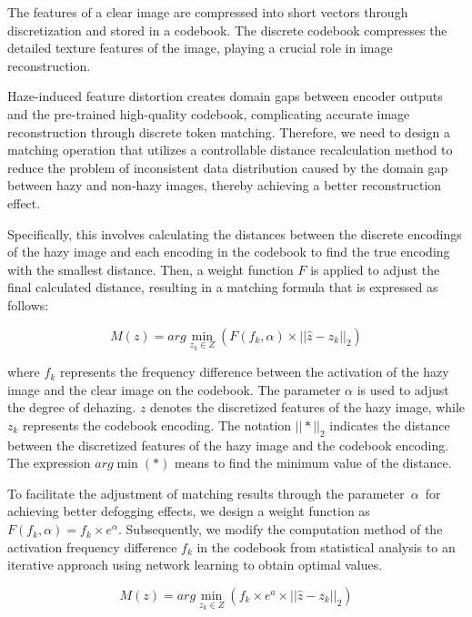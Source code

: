 \documentclass[journal]{IEEEtran}
\begin{document}
The features of a clear image are compressed into short vectors through discretization and stored in a codebook. The discrete codebook compresses the detailed texture features of the image, playing a crucial role in image reconstruction.

Haze-induced feature distortion creates domain gaps between encoder outputs and the pre-trained high-quality codebook, complicating accurate image reconstruction through discrete token matching. Therefore, we need to design a matching operation that utilizes a controllable distance recalculation method to reduce the problem of inconsistent data distribution caused by the domain gap between hazy and non-hazy images, thereby achieving a better reconstruction effect.

Specifically, this involves calculating the distances between the discrete encodings of the hazy image and each encoding in the codebook to find the true encoding with the smallest distance. Then, a weight function $F$ is applied to adjust the final calculated distance, resulting in a matching formula that is expressed as follows:

\begin{equation}
	\label{codebook_matching_equation_2}
	M(z) = arg \min_{z_{k} \in Z} (F(f_{k}, \alpha) \times || \widehat{z} - z_{k} ||_{2})
\end{equation}

\noindent where $f_{k}$ represents the frequency difference between the activation of the hazy image and the clear image on the codebook. The parameter $ \alpha $ is used to adjust the degree of dehazing. $z$ denotes the discretized features of the hazy image, while $z_{k}$ represents the codebook encoding. The notation $||*||_{2}$ indicates the distance between the discretized features of the hazy image and the codebook encoding. The expression $arg \min(*)$ means to find the minimum value of the distance.


To facilitate the adjustment of matching results through the parameter $\alpha$ for achieving better defogging effects, we design a weight function as $F(f_{k}, \alpha) = f_{k} \times e^{\alpha} $. Subsequently, we modify the computation method of the activation frequency difference $f_{k}$ in the codebook from statistical analysis to an iterative approach using network learning to obtain optimal values.

\begin{equation}
	\label{codebook_matching_equation_1}
	M(z) = arg \min_{z_{k} \in Z} (f_{k} \times e^{a} \times || \widehat{z} - z_{k} ||_{2})
\end{equation}
\end{document}
